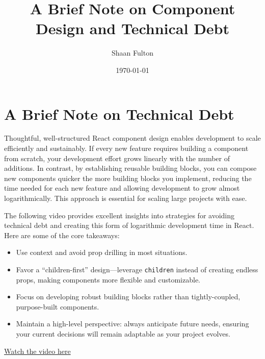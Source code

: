 \documentclass{article}
\title{A Brief Note on Component Design and Technical Debt}
\author{Shaan Fulton}
\date{\today}
\begin{document}
\maketitle

\section{A Brief Note on Technical Debt}

Thoughtful, well-structured React component design enables development to scale efficiently and sustainably. If every new feature requires building a component from scratch, your development effort grows linearly with the number of additions. In contrast, by establishing reusable building blocks, you can compose new components quicker the more building blocks you implement, reducing the time needed for each new feature and allowing development to grow almost logarithmically. This approach is essential for scaling large projects with ease.

The following video provides excellent insights into strategies for avoiding technical debt and creating this form of logarithmic development time in React. Here are some of the core takeaways:

\begin{itemize}
    \item Use context and avoid prop drilling in most situations.
    \item Favor a “children-first” design—leverage \texttt{children} instead of creating endless props, making components more flexible and customizable.
    \item Focus on developing robust building blocks rather than tightly-coupled, purpose-built components.
    \item Maintain a high-level perspective: always anticipate future needs, ensuring your current decisions will remain adaptable as your project evolves.
\end{itemize}

\noindent
\href{https://www.youtube.com/watch?v=n62Pc4KV4SM}{Watch the video here}
\end{document}
